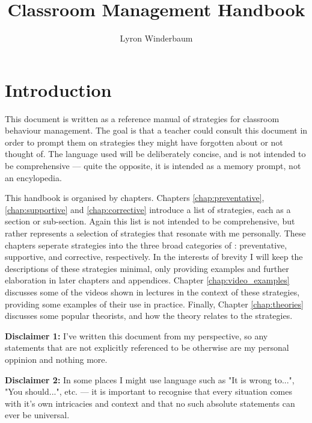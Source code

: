 \documentclass[12pt]{report}
\title{Classroom Management Handbook}
\author{Lyron Winderbaum}
\begin{document}
\maketitle

\tableofcontents

\chapter{Introduction}

This document is written as a reference manual of strategies for classroom behaviour management. The goal is that a teacher could consult this document in order to prompt them on strategies they might have forgotten about or not thought of. The language used will be deliberately concise, and is not intended to be comprehensive --- quite the opposite, it is intended as a memory prompt, not an encylopedia.

This handbook is organised by chapters. Chapters \ref{chap:preventative}, \ref{chap:supportive} and \ref{chap:corrective} introduce a list of strategies, each as a section or sub-section.
Again this list is not intended to be comprehensive, but rather represents a selection of strategies that resonate with me personally. These chapters seperate strategies into the three broad categories of \cite{Charles2002}: preventative, supportive, and corrective, respectively. In the interests of brevity I will keep the descriptions of these strategies minimal, only providing examples and further elaboration in later chapters and appendices. Chapter \ref{chap:video_examples} discusses some of the videos shown in lectures in the context of these strategies, providing some examples of their use in practice. Finally, Chapter \ref{chap:theories} discusses some popular theorists, and how the theory relates to the strategies.

\textbf{Disclaimer 1:} I've written this document from my perspective, so any statements that are not explicitly referenced to be otherwise are my personal oppinion and nothing more.

\textbf{Disclaimer 2:} In some places I might use language such as "It is wrong to...", "You should...", etc. --- it is important to recognise that every situation comes with it's own intricacies and context and that no such absolute statements can ever be universal.
\end{document}
